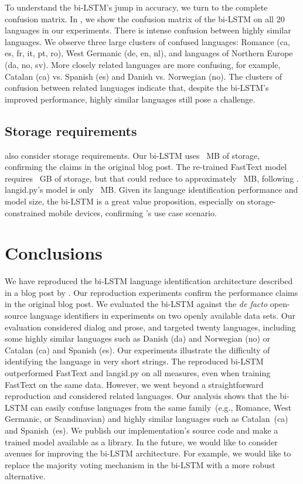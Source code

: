 \documentclass[11pt,a4paper]{article}
\newcommand{\fasttext}{FastText\xspace}
\newcommand{\langidpy}{langid.py\xspace}
\begin{document}
To understand the bi-LSTM's jump in accuracy, we turn to the complete confusion matrix. In , we show the confusion matrix of the bi-LSTM on all 20 languages in our experiments. There is intense confusion between highly similar languages. We observe three large clusters of confused languages: Romance (ca, es, fr, it, pt, ro), West Germanic (de, en, nl), and  languages of Northern Europe (da, no, sv). More closely related languages are more confusing, for example, Catalan (ca) vs. Spanish (es) and Danish vs. Norwegian (no). The clusters of confusion between related languages indicate that, despite the bi-LSTM's improved performance, highly similar languages still pose a challenge.


 \subsection{Storage requirements}
 \citet{apple} also consider storage requirements. Our bi-LSTM uses ~MB of storage, confirming the claims in the original blog post. The re-trained \fasttext model requires ~GB of storage, but that could reduce to approximately ~MB, following \citet{joulin2016fasttext}. \langidpy's model is only ~MB. Given its language identification performance and model size, the bi-LSTM is a great value proposition, especially on storage-constrained mobile devices, confirming \citeauthor{apple}'s use case scenario.


\section{Conclusions}

We have reproduced the bi-LSTM language identification architecture described in a blog post by \citet{apple}. Our reproduction experiments confirm the performance claims in the original blog post. We evaluated the bi-LSTM against the \emph{de facto} open-source language identifiers in experiments on two openly available data sets. Our evaluation considered dialog and prose, and targeted twenty languages, including some highly similar languages such as Danish (da) and Norwegian (no) or Catalan (ca) and Spanish (es). Our experiments illustrate the diﬃculty of identifying the language in very short strings. The reproduced bi-LSTM outperformed \fasttext and \langidpy on all measures, even when training \fasttext on the same data. However, we went beyond a straightforward reproduction and considered related languages. Our analysis shows that the bi-LSTM can easily confuse languages from the same family~(e.g., Romance, West Germanic, or Scandinavian) and highly similar languages such as Catalan~(ca) and Spanish~(es). We publish our implementation's source code and make a trained model available as a library. In the future, we would like to consider avenues for improving the bi-LSTM architecture. For example, we would like to replace the majority voting mechanism in the bi-LSTM with a more robust alternative.




\end{document}
